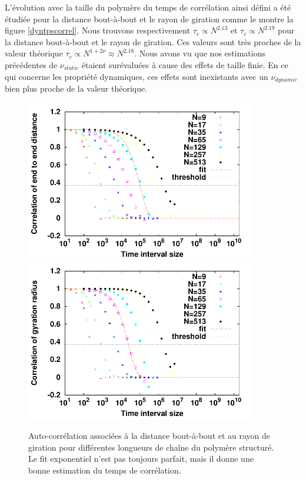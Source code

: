 L'évolution avec la taille du polymère du temps de corrélation ainsi défini a été étudiée pour la distance bout-à-bout et le rayon de giration comme le montre la figure \ref{dyntpscorrel}. Nous trouvons respectivement $\tau_c \propto N^{2.13}$ et $\tau_c \propto N^{2.19}$ pour la distance bout-à-bout et le rayon de giration. Ces valeurs sont très proches de la valeur théorique $\tau_c \propto N^{1+2\nu} \approx N^{2.18}$. Nous avons vu que nos estimations précédentes de $\nu_{static}$ étaient surévaluées à cause des effets de taille finie. En ce qui concerne les propriété dynamiques, ces effets sont inexistants avec un $\nu_{dynamic}$ bien plus proche de la valeur théorique.

\begin{figure}[H]
\begin{center}
\includegraphics[width=0.9\textwidth]{correlendtoend.pdf}
\includegraphics[width=0.9\textwidth]{correlgyr.pdf}

\caption[Résultats numériques: estimation des temps de corrélation]{Auto-corrélation associées à la distance bout-à-bout et au rayon de giration pour différentes longueurs de chaîne du polymère structuré. Le fit exponentiel n'est pas toujours parfait, mais il donne une bonne estimation du temps de corrélation.}
\label{correl}
\end{center}
\end{figure}

